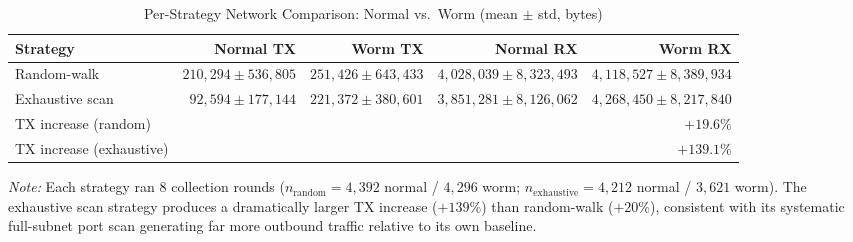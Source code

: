\begin{table}[ht]
\centering
\caption{Per-Strategy Network Comparison: Normal vs.\ Worm (mean $\pm$ std, bytes)}
\label{tab:strategy_comparison}
\begin{tabular}{lrrrr}
\toprule
\textbf{Strategy} & \textbf{Normal TX} & \textbf{Worm TX} & \textbf{Normal RX} & \textbf{Worm RX} \\
\midrule
Random-walk    & $210{,}294 \pm 536{,}805$ & $251{,}426 \pm 643{,}433$ & $4{,}028{,}039 \pm 8{,}323{,}493$ & $4{,}118{,}527 \pm 8{,}389{,}934$ \\
Exhaustive scan & $92{,}594 \pm 177{,}144$ & $221{,}372 \pm 380{,}601$ & $3{,}851{,}281 \pm 8{,}126{,}062$ & $4{,}268{,}450 \pm 8{,}217{,}840$ \\
\midrule
TX increase (random)     & \multicolumn{4}{r}{$+19.6\%$} \\
TX increase (exhaustive) & \multicolumn{4}{r}{$+139.1\%$} \\
\bottomrule
\end{tabular}
\begin{minipage}{\linewidth}
\vspace{4pt}
\small
\textit{Note:} Each strategy ran 8 collection rounds
($n_{\text{random}} = 4{,}392$ normal / $4{,}296$ worm;
$n_{\text{exhaustive}} = 4{,}212$ normal / $3{,}621$ worm).
The exhaustive scan strategy produces a dramatically larger TX increase ($+139\%$)
than random-walk ($+20\%$), consistent with its systematic full-subnet port scan
generating far more outbound traffic relative to its own baseline.
\end{minipage}
\end{table}


